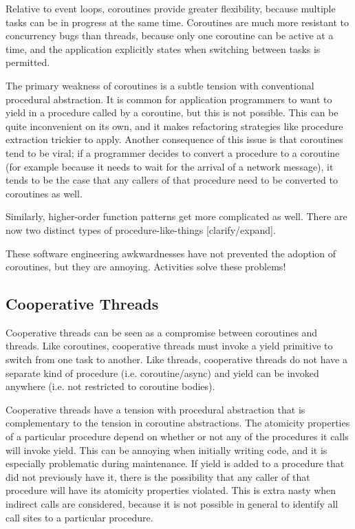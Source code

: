 \documentclass[10pt,preprint]{sigplanconf}
\begin{document}
Relative to event loops, coroutines provide greater flexibility, because multiple tasks can be in progress at the same time.
Coroutines are much more resistant to concurrency bugs than threads, because only one coroutine can be active at a time, and the application explicitly states when switching between tasks is permitted.

The primary weakness of coroutines is a subtle tension with conventional procedural abstraction.
It is common for application programmers to want to yield in a procedure called by a coroutine, but this is not possible.
This can be quite inconvenient on its own, and it makes refactoring strategies like procedure extraction trickier to apply.
Another consequence of this issue is that coroutines tend to be viral; if a programmer decides to convert a procedure to a coroutine (for example because it needs to wait for the arrival of a network message), it tends to be the case that any callers of that procedure need to be converted to coroutines as well.

Similarly, higher-order function patterns get more complicated as well.
There are now two distinct types of procedure-like-things [clarify/expand].

These software engineering awkwardnesses have not prevented the adoption of coroutines, but they are annoying.
Activities solve these problems!

\subsection{Cooperative Threads}

Cooperative threads can be seen as a compromise between coroutines and threads.
Like coroutines, cooperative threads must invoke a yield primitive to switch from one task to another.
Like threads, cooperative threads do not have a separate kind of procedure (i.e. coroutine/async) and yield can be invoked anywhere (i.e. not restricted to coroutine bodies).

Cooperative threads have a tension with procedural abstraction that is complementary to the tension in coroutine abstractions.
The atomicity properties of a particular procedure depend on whether or not any of the procedures it calls will invoke yield.
This can be annoying when initially writing code, and it is especially problematic during maintenance.
If yield is added to a procedure that did not previously have it, there is the possibility that any caller of that procedure will have its atomicity properties violated.
This is extra nasty when indirect calls are considered, because it is not possible in general to identify all call sites to a particular procedure.
\end{document}
